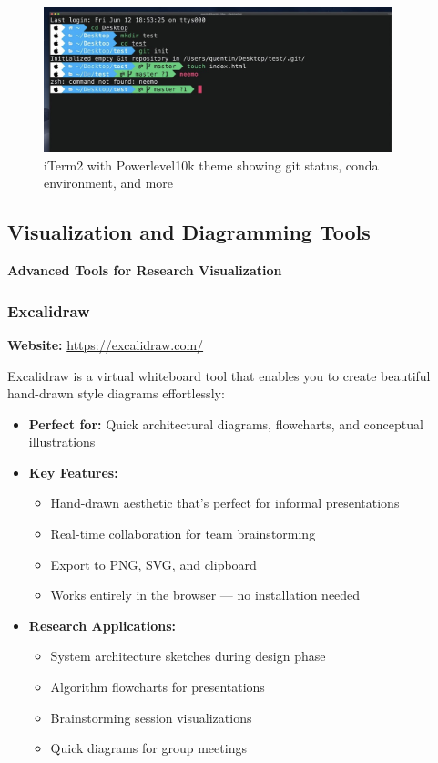\documentclass[11pt,a4paper]{article}
\begin{document}
\begin{figure}[H]
\centering
\includegraphics[width=0.9\textwidth]{iterm2.png}
\caption{iTerm2 with Powerlevel10k theme showing git status, conda environment, and more}
\end{figure}

\subsection{Visualization and Diagramming Tools}

\textbf{Advanced Tools for Research Visualization}

\subsubsection{Excalidraw}
\textbf{Website:} \url{https://excalidraw.com/}

Excalidraw is a virtual whiteboard tool that enables you to create beautiful hand-drawn style diagrams effortlessly:
\begin{itemize}
    \item \textbf{Perfect for:} Quick architectural diagrams, flowcharts, and conceptual illustrations
    \item \textbf{Key Features:}
    \begin{itemize}
        \item Hand-drawn aesthetic that's perfect for informal presentations
        \item Real-time collaboration for team brainstorming
        \item Export to PNG, SVG, and clipboard
        \item Works entirely in the browser — no installation needed
    \end{itemize}
    \item \textbf{Research Applications:}
    \begin{itemize}
        \item System architecture sketches during design phase
        \item Algorithm flowcharts for presentations
        \item Brainstorming session visualizations
        \item Quick diagrams for group meetings
    \end{itemize}
\end{itemize}
\end{document}
